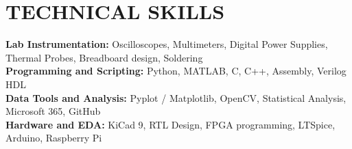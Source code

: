 \documentclass[letterpaper,11pt]{article}
\begin{document}
\section{TECHNICAL SKILLS}
 \begin{itemize}[leftmargin=0.15in, label={}]
    \small{\item{
     \textbf{Lab Instrumentation:} Oscilloscopes, Multimeters, Digital Power Supplies, Thermal Probes, Breadboard design, Soldering \\
     \textbf{Programming and Scripting:} Python, MATLAB, C, C++, Assembly, Verilog HDL \\
     \textbf{Data Tools and Analysis:} Pyplot / Matplotlib, OpenCV, Statistical Analysis, Microsoft 365, GitHub \\
     \textbf{Hardware and EDA:} KiCad 9, RTL Design, FPGA programming, LTSpice, Arduino, Raspberry Pi
    }}
 \end{itemize}


\end{document}
